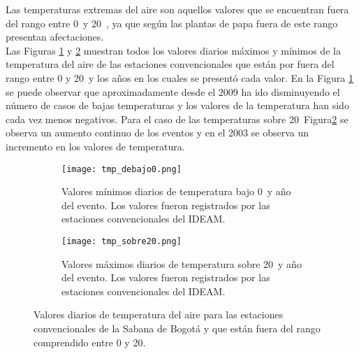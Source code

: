 Las temperaturas extremas del aire son aquellos valores que se encuentran fuera del rango entre 0\celc \  y 20\celc \ , ya que según \citet{Hijmans2003} las plantas de papa fuera de este rango presentan afectaciones.\\

Las Figuras \ref{graph:tmp_bajo0} y \ref{graph:tmp_sobre20} muestran todos los valores diarios máximos y mínimos de la temperatura del aire de las estaciones convencionales que están por fuera del rango entre 0 y 20\celc \  y los años en los cuales se presentó cada valor. En la Figura \ref{graph:tmp_bajo0} se puede observar que aproximadamente desde el 2009 ha ido disminuyendo el número de casos de bajas temperaturas y los valores de la temperatura han sido cada vez menos negativos. Para el caso de las temperaturas sobre 20\celc \ Figura\ref{graph:tmp_sobre20} se observa un aumento continuo de los eventos y en el 2003 se observa un incremento en los valores de temperatura.


\begin{figure}[H]
	\begin{subfigure}[b]{\linewidth}
	\begin{center}
	\texttt{[image: tmp\_debajo0.png]}
		
		\caption{Valores mínimos diarios de temperatura bajo 0\celc \  y año del evento. Los valores fueron registrados por las estaciones convencionales del IDEAM.}		
		\label{graph:tmp_bajo0}
		
	\end{center}
	\end{subfigure}
	
	\begin{subfigure}[b]{\linewidth}
	\begin{center}
	\texttt{[image: tmp\_sobre20.png]}
		
		\caption{Valores máximos diarios de temperatura sobre 20\celc \  y año del evento. Los valores fueron registrados por las estaciones convencionales del IDEAM.}		
		\label{graph:tmp_sobre20}
		
	\end{center}
	\end{subfigure}
	
	
	\caption{Valores diarios de temperatura del aire para las estaciones convencionales de la Sabana de Bogotá y que están fuera del rango comprendido entre 0 y 20\celc. }		
	\label{graph:limites}

\end{figure}

